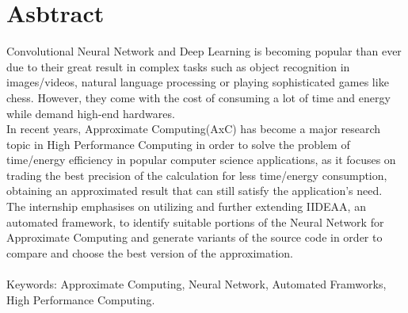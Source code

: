 \chapter*{Asbtract}
Convolutional Neural Network and Deep Learning is becoming popular than ever due to their great result in complex tasks such as object recognition in images/videos, natural language processing or playing sophisticated games like chess. However, they come with the cost of consuming a lot of time and energy while demand high-end hardwares.\\
In recent years, Approximate Computing(AxC) has become a major research topic in High Performance Computing in order to solve the problem of time/energy efficiency in popular computer science applications, as it focuses on trading the best precision of the calculation for less time/energy consumption, obtaining an approximated result that can still satisfy the application's need. \\
The internship emphasises on utilizing and further extending IIDEAA, an automated framework, to identify suitable portions of the Neural Network for Approximate Computing and generate variants of the source code in order to compare and choose the best version of the approximation.\\
\\
Keywords: Approximate Computing, Neural Network, Automated Framworks, High Performance Computing.